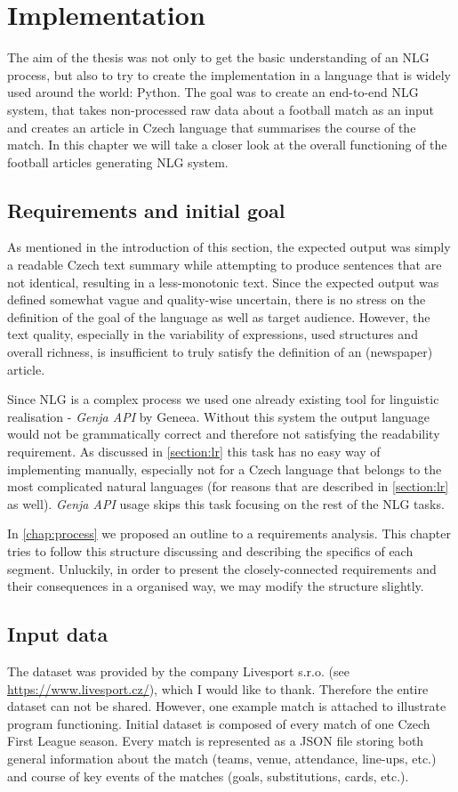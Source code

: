 \chapter{Implementation}\label{chap:implementation}

 The aim of the thesis was not only to get the basic understanding of an NLG process, but also to try to create the implementation in a language that is widely used around the world: Python.  The goal was to create an end-to-end NLG system, that takes non-processed raw data about a football match as an input and creates an article in Czech language that summarises the course of the match. In this chapter we will take a closer look at the overall functioning of the football articles generating NLG system.

\section{Requirements and initial goal}
As mentioned in the introduction of this section, the expected output was simply a readable Czech text summary while attempting to produce sentences that are not identical, resulting in a less-monotonic text. Since the expected output was defined somewhat vague and quality-wise uncertain, there is no stress on the definition of the goal of the language as well as target audience. However, the text quality, especially in the variability of expressions, used structures and overall richness, is insufficient to truly satisfy the definition of an (newspaper) article. 

Since NLG is a complex process we used one already existing tool for linguistic realisation - \emph{Genja API} by Geneea. Without this system the output language would not be grammatically correct and therefore not satisfying the readability requirement. As discussed in \ref{section:lr} this task has no easy way of implementing manually, especially not for a Czech language that belongs to the most complicated natural languages (for reasons that are described in \ref{section:lr} as well). \emph{Genja API} usage skips this task focusing on the rest of the NLG tasks.

In \autoref{chap:process} we proposed an outline to a requirements analysis. This chapter tries to follow this structure discussing and describing the specifics of each segment. Unluckily, in order to present the closely-connected requirements and their consequences in a organised way, we may modify the structure slightly.

\section{Input data}
The dataset was provided by the company Livesport s.r.o. (see \url{https://www.livesport.cz/}), which I would like to thank. Therefore the entire dataset can not be shared. However, one example match is attached to illustrate program functioning. Initial dataset is composed of every match of one Czech First League season. Every match is represented as a JSON file storing both general information about the match (teams, venue, attendance, line-ups, etc.) and course of key events of the matches (goals, substitutions, cards, etc.). 

